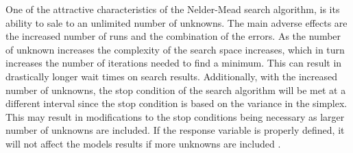\documentclass[pdflatex,sn-mathphys]{sn-jnl}
\begin{document}
	One of the attractive characteristics of the Nelder-Mead search algorithm, is its ability to sale to an unlimited number of unknowns.  The main adverse effects are the increased number of runs and the combination of the errors.  As the number of unknown increases the complexity of the search space increases, which in turn increases the number of iterations needed to find a minimum.  This can result in drastically longer wait times on search results.  Additionally, with the increased number of unknowns, the stop condition of the search algorithm will be met at a different interval since the stop condition is based on the variance in the simplex.  This may result in modifications to the stop conditions being necessary as larger number of unknowns are included.  If the response variable is properly defined, it will not affect the models results if more unknowns are included \cite{wang_2011}.
\end{document}
